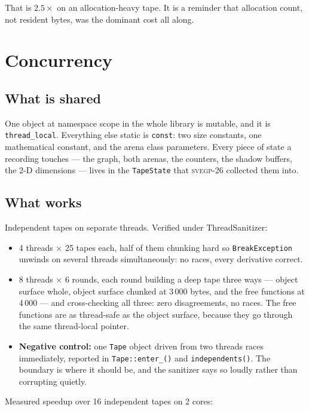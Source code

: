 \documentclass[11pt,a4paper]{report}
\newcommand{\svegp}[1]{\textsc{svegp-#1}}
\newcommand{\code}[1]{\texttt{#1}}
\begin{document}
\noindent
That is $2.5\times$ on an allocation-heavy tape. It is a reminder that
allocation count, not resident bytes, was the dominant cost all along.

\chapter{Concurrency}
\label{ch:threads}

\section{What is shared}

One object at namespace scope in the whole library is mutable, and it is
\code{thread\_local}. Everything else static is \code{const}: two size
constants, one mathematical constant, and the arena class parameters. Every
piece of state a recording touches --- the graph, both arenas, the counters, the
shadow buffers, the 2-D dimensions --- lives in the \code{TapeState} that
\svegp{26} collected them into.

\section{What works}

Independent tapes on separate threads. Verified under ThreadSanitizer:

\begin{itemize}
\item 4 threads $\times$ 25 tapes each, half of them chunking hard so
      \code{BreakException} unwinds on several threads simultaneously: no races,
      every derivative correct.
\item 8 threads $\times$ 6 rounds, each round building a deep tape three ways
      --- object surface whole, object surface chunked at 3\,000 bytes, and the
      free functions at 4\,000 --- and cross-checking all three: zero
      disagreements, no races. The free functions are as thread-safe as the
      object surface, because they go through the same thread-local pointer.
\item \textbf{Negative control:} one \code{Tape} object driven from two threads
      races immediately, reported in \code{Tape::enter\_()} and
      \code{independents()}. The boundary is where it should be, and the
      sanitizer says so loudly rather than corrupting quietly.
\end{itemize}

Measured speedup over 16 independent tapes on 2 cores:
\end{document}
